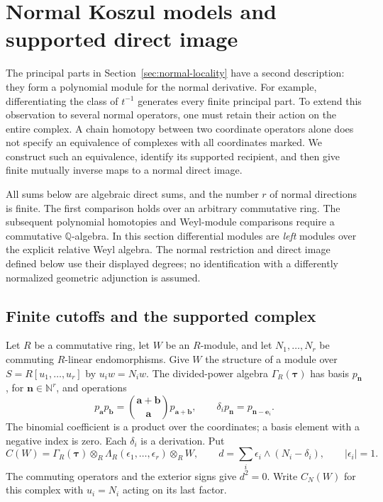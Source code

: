 \section{Normal Koszul models and supported direct image}
\label{ns:sec}

The principal parts in Section~\ref{sec:normal-locality} have a second
description: they form a polynomial module for the normal derivative.
For example, differentiating the class of \(t^{-1}\) generates every
finite principal part.  To extend this observation to several normal
operators, one must retain their action on the entire complex.  A chain
homotopy between two coordinate operators alone does not specify an
equivalence of complexes with all coordinates marked.  We construct
such an equivalence, identify its supported recipient, and then give
finite mutually inverse maps to a normal direct image.

All sums below are algebraic direct sums, and the number \(r\) of
normal directions is finite.  The first comparison holds over an
arbitrary commutative ring.  The subsequent polynomial homotopies and
Weyl-module comparisons require a commutative \(\mathbb Q\)-algebra.
In this section differential modules are \emph{left} modules over the
explicit relative Weyl algebra.  The normal restriction and direct
image defined below use their displayed degrees; no identification
with a differently normalized geometric adjunction is assumed.

\subsection{Finite cutoffs and the supported complex}

Let \(R\) be a commutative ring, let \(W\) be an \(R\)-module, and
let \(N_1,\ldots,N_r\) be commuting \(R\)-linear endomorphisms.
Give \(W\) the structure of a module over
\(S=R[u_1,\ldots,u_r]\) by \(u_iw=N_iw\).
The divided-power algebra \(\Gamma_R(\boldsymbol\tau)\) has basis
\(p_{\boldsymbol n}\), for \(\boldsymbol n\in\mathbb N^r\), and
operations
\[
 p_{\boldsymbol a}p_{\boldsymbol b}
   =\binom{\boldsymbol a+\boldsymbol b}{\boldsymbol a}
      p_{\boldsymbol a+\boldsymbol b},\qquad
 \delta_i p_{\boldsymbol n}=p_{\boldsymbol n-\boldsymbol e_i}.
\]
The binomial coefficient is a product over the coordinates; a basis
element with a negative index is zero.  Each \(\delta_i\) is a
derivation.  Put
\begin{equation}\label{ns:eq:normal-complex}
 C(W)=\Gamma_R(\boldsymbol\tau)\otimes_R
       \Lambda_R(\epsilon_1,\ldots,\epsilon_r)\otimes_R W,
 \qquad
 d=\sum_i\epsilon_i\wedge(N_i-\delta_i),
 \qquad |\epsilon_i|=1.
\end{equation}
The commuting operators and the exterior signs give \(d^2=0\).
Write \(C_N(W)\) for this complex with \(u_i=N_i\) acting on its
last factor.

